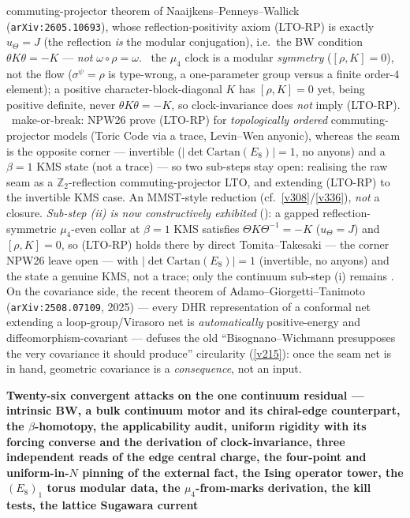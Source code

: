 \documentclass[11pt,a4paper]{article}
\newcommand{\Z}{\mathbb Z}
\begin{document}
\begin{keybox}
commuting-projector theorem of Naaijkens--Penneys--Wallick (\texttt{arXiv:2605.10693}), whose reflection-positivity
axiom (LTO-RP) is exactly $u_\Theta{=}J$ (the reflection \emph{is} the modular conjugation), i.e.\ the BW condition
$\theta K\theta{=}-K$ --- \emph{not} $\omega{\circ}\rho{=}\omega$. \mE\ the $\mu_4$ clock is a modular \emph{symmetry}
($[\rho,K]{=}0$), not the flow ($\sigma^\psi{=}\rho$ is type-wrong, a one-parameter group versus a finite order-$4$
element); a positive character-block-diagonal $K$ has $[\rho,K]{=}0$ yet, being positive definite, never
$\theta K\theta{=}-K$, so clock-invariance does \emph{not} imply (LTO-RP). \mO\ make-or-break: NPW26 prove (LTO-RP)
for \emph{topologically ordered} commuting-projector models (Toric Code via a trace, Levin--Wen anyonic), whereas the
seam is the opposite corner --- invertible ($|\det\mathrm{Cartan}(E_8)|{=}1$, no anyons) and a $\beta{=}1$ KMS state
(not a trace) --- so two sub-steps stay open: realising the raw seam as a $\Z_2$-reflection commuting-projector LTO,
and extending (LTO-RP) to the invertible KMS case. An MMST-style reduction (cf.\ \vref{v308}/\vref{v336}), \emph{not}
a closure. \emph{Sub-step (ii) is now constructively exhibited} (): a gapped
reflection-symmetric $\mu_4$-even collar at $\beta{=}1$ KMS satisfies $\Theta K\Theta^{-1}{=}{-}K$
($u_\Theta{=}J$) and $[\rho,K]{=}0$, so (LTO-RP) holds there by direct Tomita--Takesaki --- the corner NPW26
leave open --- with $|\!\det\mathrm{Cartan}(E_8)|{=}1$ (invertible, no anyons) and the state a genuine KMS,
not a trace; only the continuum sub-step (i) remains \mO. On the covariance side, the recent theorem of
Adamo--Giorgetti--Tanimoto (\texttt{arXiv:2508.07109}, 2025) --- every DHR representation of a conformal net
extending a loop-group/Virasoro net is \emph{automatically} positive-energy and diffeomorphism-covariant ---
defuses the old ``Bisognano--Wichmann presupposes the very covariance it should produce'' circularity (\vref{v215}):
once the seam net is in hand, geometric covariance is a \emph{consequence}, not an input.
\par\smallskip\noindent\textbf{Twenty-six convergent attacks on the one continuum residual --- intrinsic BW, a
bulk continuum motor and its chiral-edge counterpart, the $\beta$-homotopy, the applicability audit, uniform
rigidity with its forcing converse and the derivation of clock-invariance, three independent reads of the edge
central charge, the four-point and uniform-in-$N$ pinning of the external fact, the Ising operator tower, the
$(E_8)_1$ torus modular data, the $\mu_4$-from-marks derivation, the kill tests, the lattice Sugawara current
}
\end{keybox}
\end{document}
